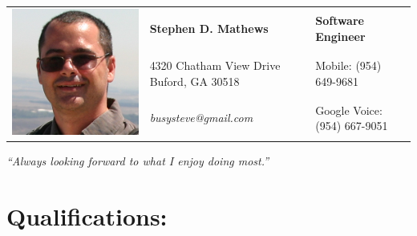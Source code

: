 \documentclass[10pt]{report}
\begin{document}
{
\setlength{\arrayrulewidth}{.4em}

\noindent
\begin{table}
\begin{tabular}{ L{5em} L{.5\textwidth}  R{.35\textwidth} }
\hline
{}
& \textbf{Stephen D. Mathews} & \textbf{Software Engineer} \\
& 4320 Chatham View Drive Buford, GA 30518 & Mobile: (954) 649-9681 \\
& \textsl{busysteve@gmail.com} &  Google Voice: (954) 667-9051 \\
\hline
\end{tabular}
	\center
	\sl ``Always looking forward to what I enjoy doing most.''
\end{table}
\begin{quote}
\end{quote}
}






\section*{Qualifications:}
\end{document}
